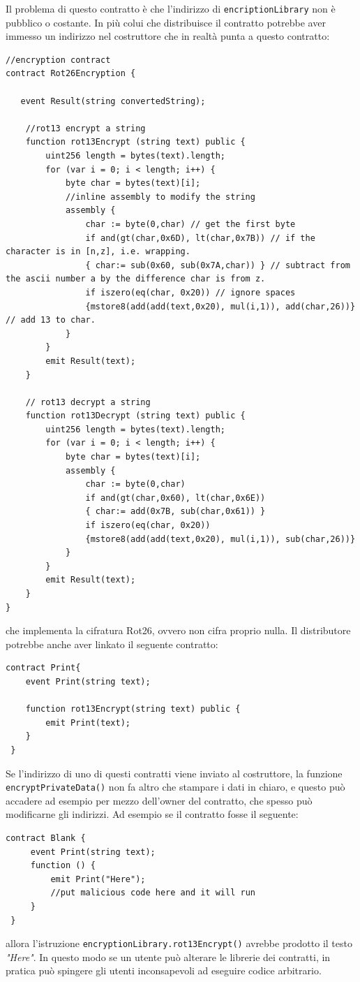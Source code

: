 Il problema di questo contratto è che l'indirizzo di \texttt{encriptionLibrary} non è pubblico o costante. In più colui che distribuisce il contratto potrebbe aver immesso un indirizzo nel costruttore che in realtà punta a questo contratto:
\begin{lstlisting}[language=Solidity]
//encryption contract
contract Rot26Encryption {
     
   event Result(string convertedString);
   
    //rot13 encrypt a string
    function rot13Encrypt (string text) public {
        uint256 length = bytes(text).length;
        for (var i = 0; i < length; i++) {
            byte char = bytes(text)[i];
            //inline assembly to modify the string
            assembly {
                char := byte(0,char) // get the first byte
                if and(gt(char,0x6D), lt(char,0x7B)) // if the character is in [n,z], i.e. wrapping. 
                { char:= sub(0x60, sub(0x7A,char)) } // subtract from the ascii number a by the difference char is from z. 
                if iszero(eq(char, 0x20)) // ignore spaces
                {mstore8(add(add(text,0x20), mul(i,1)), add(char,26))} // add 13 to char. 
            }
        }
        emit Result(text);
    }
    
    // rot13 decrypt a string
    function rot13Decrypt (string text) public {
        uint256 length = bytes(text).length;
        for (var i = 0; i < length; i++) {
            byte char = bytes(text)[i];
            assembly {
                char := byte(0,char)
                if and(gt(char,0x60), lt(char,0x6E))
                { char:= add(0x7B, sub(char,0x61)) }
                if iszero(eq(char, 0x20))
                {mstore8(add(add(text,0x20), mul(i,1)), sub(char,26))}
            }
        }
        emit Result(text);
    }
}
\end{lstlisting}
che implementa la cifratura Rot26, ovvero non cifra proprio nulla. Il distributore potrebbe anche aver linkato il seguente contratto:
\begin{lstlisting}[language=Solidity]
contract Print{
    event Print(string text);
    
    function rot13Encrypt(string text) public {
        emit Print(text);
    }
 }
\end{lstlisting}
Se l'indirizzo di uno di questi contratti viene inviato al costruttore, la funzione \texttt{encryptPrivateData()} non fa altro che stampare i dati in chiaro, e questo può accadere ad esempio per mezzo dell'owner del contratto, che spesso può modificarne gli indirizzi. Ad esempio se il contratto fosse il seguente:
\begin{lstlisting}
contract Blank {
     event Print(string text);
     function () {
         emit Print("Here");
         //put malicious code here and it will run
     }
 }
\end{lstlisting}
allora l'istruzione \texttt{encryptionLibrary.rot13Encrypt()} avrebbe prodotto il testo \textit{"Here"}. In questo modo se un utente può alterare le librerie dei contratti, in pratica può spingere gli utenti inconsapevoli ad eseguire codice arbitrario.

